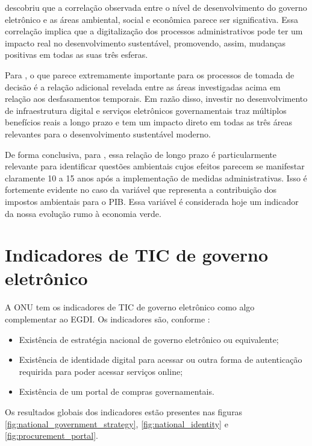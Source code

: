 \cite{ziolo2022government} descobriu que a correlação observada entre o nível de desenvolvimento do governo eletrônico e as áreas ambiental, social e econômica parece ser significativa. Essa correlação implica que a digitalização dos processos administrativos pode ter um impacto real no desenvolvimento sustentável,
promovendo, assim, mudanças positivas em todas as suas três esferas.

Para \cite{ziolo2022government}, o que parece extremamente importante para os processos de tomada de decisão é a relação adicional revelada entre as áreas investigadas acima em relação aos desfasamentos temporais. Em razão disso,  investir no desenvolvimento de infraestrutura digital e serviços eletrônicos governamentais traz múltiplos benefícios reais a longo prazo e tem um impacto direto em todas as três áreas relevantes para o desenvolvimento sustentável moderno.

De forma conclusiva, para \cite{ziolo2022government}, essa relação de longo prazo é particularmente relevante para identificar questões ambientais cujos efeitos parecem se manifestar claramente 10 a 15 anos após a implementação de medidas administrativas. Isso é fortemente evidente no caso da variável que representa a contribuição dos impostos ambientais para o PIB. Essa variável é considerada hoje um indicador da nossa evolução rumo à economia verde.

\section{Indicadores de TIC de governo eletrônico}
\label{indicadores_tic_egov}

A ONU tem os indicadores de TIC de governo eletrônico como algo complementar ao EGDI. Os indicadores são, conforme \cite{ONU_ICT_in_government_indicators}:

\begin{itemize}
	\item Existência de estratégia nacional de governo eletrônico ou equivalente;
	\item Existência de identidade digital para acessar ou outra forma de autenticação requirida para poder acessar serviços online;
	\item Existência de um portal de compras governamentais.
\end{itemize}

Os resultados globais dos indicadores estão presentes nas figuras \ref{fig:national_government_strategy}, \ref{fig:national_identity} e \ref{fig:procurement_portal}.

